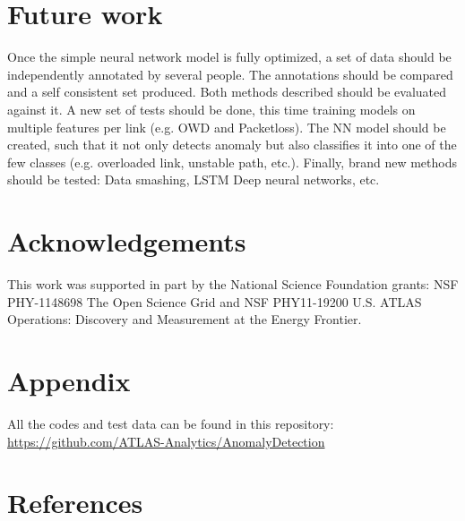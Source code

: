 \documentclass[5p]{elsarticle}
\begin{document}
\section{Future work}
Once the simple neural network model is fully optimized, a set of data should be independently annotated by several people. The annotations should be compared and a self consistent set produced. Both methods described should be evaluated against it.  A new set of tests should be done, this time training models on multiple features per link (e.g. OWD and Packetloss). The NN model should be created, such that it not only detects anomaly but also classifies it into one of the few classes (e.g. overloaded link, unstable path, etc.). Finally, brand new methods should be tested: Data smashing\cite{twelve}, LSTM Deep neural networks\cite{sixteen}, etc.   

\section{Acknowledgements}

This work was supported in part by the National Science Foundation grants: NSF PHY-1148698 The Open Science Grid and NSF PHY11-19200 U.S. ATLAS Operations: Discovery and Measurement at the Energy Frontier.

\section{Appendix}

\renewcommand*{\UrlFont}{\relsize{-0.5}\relax}

All the codes and test data can be found in this repository: \\
\url{https://github.com/ATLAS-Analytics/AnomalyDetection}

\section*{References}



\end{document}
